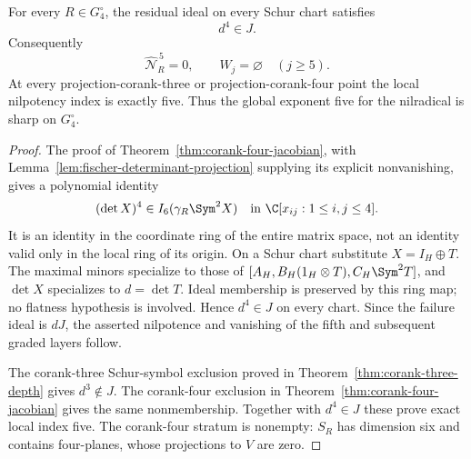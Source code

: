 \begin{theorem}
\label{thm:sharp-global-jacobian-depth}
For every \(R\in G_4^\circ\), the residual ideal on every Schur
chart satisfies
\[
 d^4\in J.
\]
Consequently
\[
 \widehat{\mathcal N}_R^{\,5}=0,
 \qquad W_j=\varnothing\quad(j\ge5).
\]
At every projection-corank-three or projection-corank-four point the
local nilpotency index is exactly five.  Thus the global exponent five
for the nilradical is sharp on \(G_4^\circ\).
\end{theorem}
\begin{proof}
The proof of Theorem~\ref{thm:corank-four-jacobian}, with
Lemma~\ref{lem:fischer-determinant-projection} supplying its explicit
nonvanishing, gives a polynomial identity
\[
 (\det X)^4\in I_6(\gamma_R\Sym^2X)
 \quad\text{in }\C[x_{ij}:1\le i,j\le4].
\]
It is an identity in the coordinate ring of the entire matrix space,
not an identity valid only in the local ring of its origin.  On a Schur
chart substitute \(X=I_H\oplus T\).  The maximal minors specialize
to those of
\([A_H,B_H(1_H\otimes T),C_H\Sym^2T]\), and \(\det X\) specializes
to \(d=\det T\).  Ideal membership is preserved by this ring map;
no flatness hypothesis is involved.  Hence \(d^4\in J\) on every
chart.  Since the failure ideal is \(dJ\), the asserted nilpotence
and vanishing of the fifth and subsequent graded layers follow.

The corank-three Schur-symbol exclusion proved in
Theorem~\ref{thm:corank-three-depth} gives \(d^3\notin J\).
The corank-four exclusion in
Theorem~\ref{thm:corank-four-jacobian} gives the same nonmembership.
Together with \(d^4\in J\) these prove exact local index five.
The corank-four stratum is nonempty: \(S_R\) has dimension six and
contains four-planes, whose projections to \(V\) are zero.
\end{proof}

